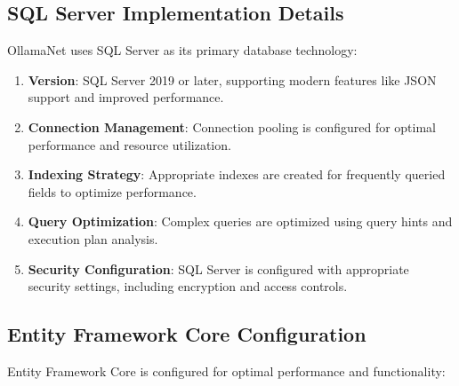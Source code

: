 \subsection{SQL Server Implementation Details}

OllamaNet uses SQL Server as its primary database technology:

\begin{enumerate}
   \item \textbf{Version}: SQL Server 2019 or later, supporting modern features like JSON support and improved performance.

   \item \textbf{Connection Management}: Connection pooling is configured for optimal performance and resource utilization.

   \item \textbf{Indexing Strategy}: Appropriate indexes are created for frequently queried fields to optimize performance.

   \item \textbf{Query Optimization}: Complex queries are optimized using query hints and execution plan analysis.

   \item \textbf{Security Configuration}: SQL Server is configured with appropriate security settings, including encryption and access controls.
\end{enumerate}

\subsection{Entity Framework Core Configuration}

Entity Framework Core is configured for optimal performance and functionality:

